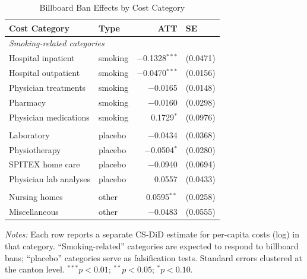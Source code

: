 \begin{table}[t]
\centering
\caption{Billboard Ban Effects by Cost Category}
\label{tab:categories}
\begin{tabular}{llrl}
\hline\hline
Cost Category & Type & ATT & SE \\
\hline
\multicolumn{4}{l}{\textit{Smoking-related categories}} \\
Hospital inpatient & smoking & $-$0.1328$^{***}$ & (0.0471) \\
Hospital outpatient & smoking & $-$0.0470$^{***}$ & (0.0156) \\
Physician treatments & smoking & $-$0.0165 & (0.0148) \\
Pharmacy & smoking & $-$0.0160 & (0.0298) \\
Physician medications & smoking & 0.1729$^{*}$ & (0.0976) \\
\addlinespace
\multicolumn{4}{l}{\textit{Placebo categories (non-smoking-related)}} \\
Laboratory & placebo & $-$0.0434 & (0.0368) \\
Physiotherapy & placebo & $-$0.0504$^{*}$ & (0.0280) \\
SPITEX home care & placebo & $-$0.0940 & (0.0694) \\
Physician lab analyses & placebo & 0.0557 & (0.0433) \\
\addlinespace
\multicolumn{4}{l}{\textit{Other categories}} \\
Nursing homes & other & 0.0595$^{**}$ & (0.0258) \\
Miscellaneous & other & $-$0.0483 & (0.0555) \\
\hline\hline
\end{tabular}
\begin{tablenotes}
\item \textit{Notes:} Each row reports a separate CS-DiD estimate for per-capita costs (log) in that category. ``Smoking-related'' categories are expected to respond to billboard bans; ``placebo'' categories serve as falsification tests. Standard errors clustered at the canton level. $^{***}p<0.01$; $^{**}p<0.05$; $^{*}p<0.10$.
\end{tablenotes}
\end{table}
